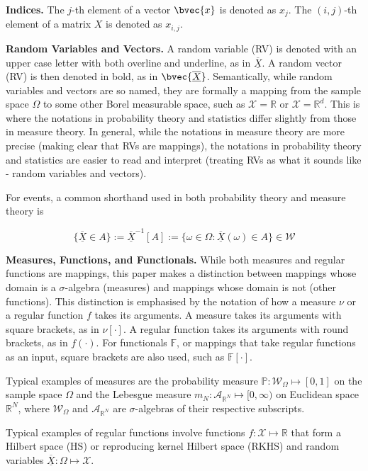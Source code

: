 \documentclass[twoside]{article} \usepackage{aistats2017}
\newcommand{\rv}[1]{\underline{\overline{#1}}}
\begin{document}
	\textbf{Indices.} The $j$-th element of a vector $\bvec{x}$ is denoted as $x_{j}$. The $(i, j)$-th element of a matrix $X$ is denoted as $x_{i, j}$.
	
	\textbf{Random Variables and Vectors.} A random variable (RV) is denoted with an upper case letter with both overline and underline, as in $\rv{X}$. A random vector (RV) is then denoted in bold, as in $\bvec{\rv{X}}$. Semantically, while random variables and vectors are so named, they are formally a mapping from the sample space $\Omega$ to some other Borel measurable space, such as $\mathcal{X} = \mathbb{R}$ or $\mathcal{X} = \mathbb{R}^{d}$. This is where the notations in probability theory and statistics differ slightly from those in measure theory. In general, while the notations in measure theory are more precise (making clear that RVs are mappings), the notations in probability theory and statistics are easier to read and interpret (treating RVs as what it sounds like - random variables and vectors).
	
	For events, a common shorthand used in both probability theory and measure theory is
	
	\begin{equation}
		\{\rv{X} \in A\} := \rv{X}^{-1}[A] := \{\omega \in \Omega : \rv{X}(\omega) \in A\} \in \mathcal{W}
	\end{equation}
	
	\textbf{Measures, Functions, and Functionals.} While both measures and regular functions are mappings, this paper makes a distinction between mappings whose domain is a $\sigma$-algebra (measures) and mappings whose domain is not (other functions). This distinction is emphasised by the notation of how a measure $\nu$ or a regular function $f$ takes its arguments. A measure takes its arguments with square brackets, as in $\nu[\cdot]$. A regular function takes its arguments with round brackets, as in $f(\cdot)$. For functionals $\mathbb{F}$, or mappings that take regular functions as an input, square brackets are also used, such as $\mathbb{F}[\cdot]$.
	
	Typical examples of measures are the probability measure $\mathbb{P} : \mathcal{W}_{\Omega} \mapsto [0, 1]$ on the sample space $\Omega$ and the Lebesgue measure $m_{N} : \mathcal{A}_{\mathbb{R}^{N}} \mapsto [0, \infty)$ on Euclidean space $\mathbb{R}^{N}$, where $\mathcal{W}_{\Omega}$ and $\mathcal{A}_{\mathbb{R}^{N}}$ are $\sigma$-algebras of their respective subscripts.
	
	Typical examples of regular functions involve functions $f : \mathcal{X} \mapsto \mathbb{R}$ that form a Hilbert space (HS) or reproducing kernel Hilbert space (RKHS) and random variables $\rv{X} : \Omega \mapsto \mathcal{X}$.
	
\end{document}
